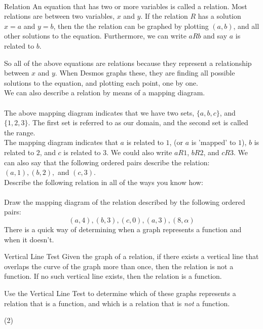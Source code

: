 \documentclass[12pt,fleqn]{book}
\begin{document}
\\[1em]
\begin{defn}{Relation}{}
    An equation that has two or more variables is called a relation.  Most relations are between two variables, $x$ and $y$.  If the relation $R$ has a solution $x=a$ and $y=b$, then the the relation can be graphed by plotting $(a,b)$, and all other solutions to the equation.  Furthermore, we can write $a R b$ and say $a$ is related to $b$.
\end{defn}
So all of the above equations are relations because they represent a relationship between $x$ and $y$.  When Desmos graphs these, they are finding all possible solutions to the equation, and plotting each point, one by one.
\\[1em]
We can also describe a relation by means of a mapping diagram.
\\[1em]
\\[1em]
The above mapping diagram indicates that we have two sets, $\{a, b, c\}$, and $\{1, 2, 3\}$.
The first set is referred to as our domain, and the second set is called the range.
\\[1em]
The mapping diagram indicates that $a$ is related to $1$, (or $a$ is 'mapped' to $1$), $b$ is related to $2$, and $c$ is related to $3$.  We could also write $aR1$, $bR2$, and $cR3$.  We can also say that the following ordered pairs describe the relation: $(a,1), (b,2),$ and $(c,3)$.
\\[1em]
Describe the following relation in all of the ways you know how:
\\[1em]
\\[1em]
Draw the mapping diagram of the relation described by the following ordered pairs:
\[
    (a,4),(b,3),(c,0),(a,3),(8,\alpha)
\]
There is a quick way of determining when a graph represents a function and when it doesn't.  
\begin{defn}{Vertical Line Test}{}
Given the graph of a relation, if there exists a vertical line that overlaps the curve of the graph more than once, then the relation is not a function.  If no such vertical line exists, then the relation is a function.
\end{defn}
Use the Vertical Line Test to determine which of these graphs represents a relation that is a function, and which is a relation that is \emph{not} a function.
\begin{tasks}(2)
\task {}
\task {}
\task {}
\task {}
\task {}
\task {}
\task {}
\task {}
\end{tasks}
\end{document}
